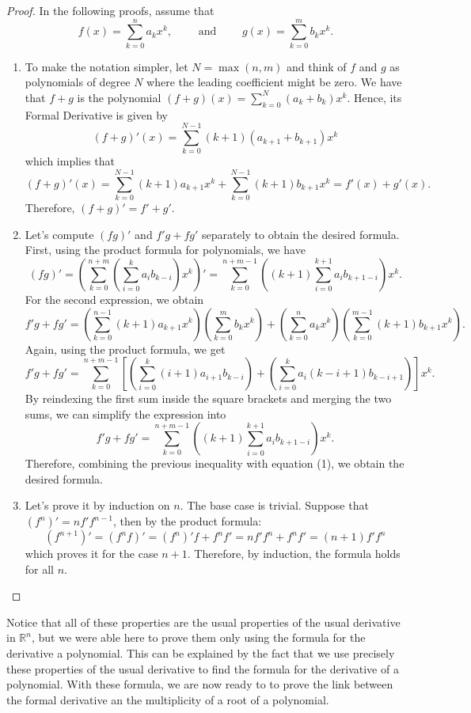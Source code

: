 \documentclass{article}
\theoremstyle{plain}
\theoremstyle{definition}
\newcommand{\R}{\mathbb{R}}
\begin{document}
\begin{proof}
    In the following proofs, assume that
    $$f(x) = \sum_{k=0}^{n}a_kx^k, \qquad \text{ and } \qquad g(x) = \sum_{k=0}^{m}b_kx^k.$$
    \begin{enumerate}
        \item To make the notation simpler, let $N = \max(n,m)$ and think of $f$ and $g$ as polynomials of degree $N$ where the leading coefficient might be zero. We have that $f + g$ is the polynomial $(f+g)(x) = \sum_{k=0}^{N}(a_k + b_k)x^k$. Hence, its Formal Derivative is given by
        $$(f+g)'(x) = \sum_{k=0}^{N - 1}(k+1)(a_{k+1} + b_{k+1})x^k$$
        which implies that 
        $$(f+g)'(x) = \sum_{k=0}^{N-1}(k+1)a_{k+1}x^k + \sum_{k=0}^{N - 1}(k+1)b_{k+1}x^k = f'(x) + g'(x).$$
        Therefore, $(f+g)' = f' + g'$.
        \item Let's compute $(fg)'$ and $f'g + fg'$ separately to obtain the desired formula. First, using the product formula for polynomials, we have
        \[(fg)' = \left(\sum_{k=0}^{n+m}\left(\sum_{i=0}^{k}a_i b_{k-i}\right)x^k\right)' = \sum_{k=0}^{n+m - 1}\left((k+1)\sum_{i=0}^{k+1}a_i b_{k+1-i}\right)x^k. \tag*{(1)} \]
        For the second expression, we obtain
        $$f'g+fg' = \left(\sum_{k=0}^{n-1}(k+1)a_{k+1}x^k \right)\left(\sum_{k=0}^{m}b_kx^k\right) + \left(\sum_{k=0}^{n}a_kx^k\right)\left(\sum_{k=0}^{m-1}(k+1)b_{k+1}x^k \right).$$
        Again, using the product formula, we get
        $$f'g+fg' = \sum_{k=0}^{n+m-1}\left[\left(\sum_{i=0}^{k}(i+1)a_{i+1}b_{k-i}\right) + \left(\sum_{i=0}^{k}a_i (k-i + 1)b_{k - i +1}\right)\right]x^k.$$
        By reindexing the first sum inside the square brackets and merging the two sums, we can simplify the expression into
        $$f'g+fg'  = \sum_{k=0}^{n+m - 1}\left((k+1)\sum_{i=0}^{k+1}a_i b_{k+1-i}\right)x^k.$$
        Therefore, combining the previous inequality with equation (1), we obtain the desired formula.
        \item Let's prove it by induction on $n$. The base case is trivial. Suppose that $(f^n)' = nf'f^{n-1}$, then by the product formula:
        $$(f^{n+1})' = (f^n f)' = (f^n)'f + f^n f' = nf'f^n + f^n f' = (n+1)f'f^{n}$$
        which proves it for the case $n+1$. Therefore, by induction, the formula holds for all $n$.
    \end{enumerate}
\end{proof}

Notice that all of these properties are the usual properties of the usual derivative in $\R^n$, but we were able here to prove them only using the formula for the derivative a polynomial. This can be explained by the fact that we use precisely these properties of the usual derivative to find the formula for the derivative of a polynomial. With these formula, we are now ready to to prove the link between the formal derivative an the multiplicity of a root of a polynomial.
\end{document}
